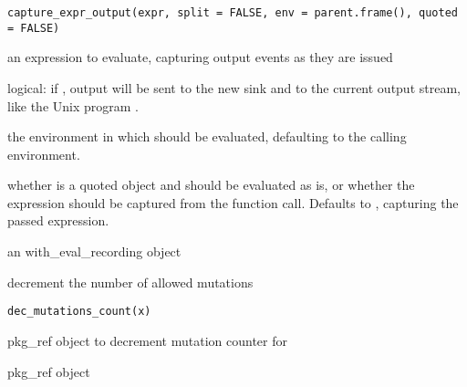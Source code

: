 \documentclass[a4paper]{book}
\begin{document}
%
\begin{Usage}
\begin{verbatim}
capture_expr_output(expr, split = FALSE, env = parent.frame(), quoted = FALSE)
\end{verbatim}
\end{Usage}
%
\begin{Arguments}
\begin{ldescription}
\item[\code{expr}] an expression to evaluate, capturing output events as they
are issued

\item[\code{split}] logical: if , output will be sent to the new
sink and to the current output stream, like the Unix program .

\item[\code{env}] the environment in which  should be evaluated,
defaulting to the calling environment.

\item[\code{quoted}] whether  is a quoted object and should be evaluated
as is, or whether the expression should be captured from the function call.
Defaults to , capturing the passed expression.
\end{ldescription}
\end{Arguments}
%
\begin{Value}
an with\_eval\_recording object
\end{Value}
%
\begin{Description}
decrement the number of allowed mutations
\end{Description}
%
\begin{Usage}
\begin{verbatim}
dec_mutations_count(x)
\end{verbatim}
\end{Usage}
%
\begin{Arguments}
\begin{ldescription}
\item[\code{x}] pkg\_ref object to decrement mutation counter for
\end{ldescription}
\end{Arguments}
%
\begin{Value}
pkg\_ref object
\end{Value}
\end{document}
